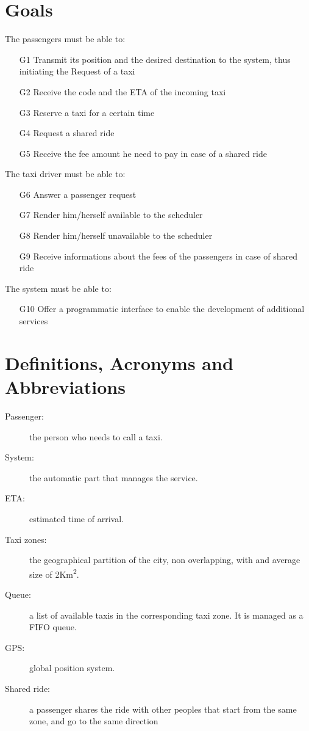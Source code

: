 \documentclass[a4paper,11pt]{report}
\begin{document}
\section{Goals}
The passengers must be able to:
\begin{itemize}
  \item [G1] Transmit its position and the desired destination to the system, thus initiating the Request of a taxi
  \item [G2] Receive the code and the ETA of the incoming taxi
  \item [G3] Reserve a taxi for a certain time
  \item [G4] Request a shared ride
  \item [G5] Receive the fee amount he need to pay in case of a shared ride
\end{itemize}
The taxi driver must be able to:
\begin{itemize}
  \item [G6] Answer a passenger request
  \item [G7] Render him/herself available to the scheduler
  \item [G8] Render him/herself unavailable to the scheduler
  \item [G9] Receive informations about the fees of the passengers in case of shared ride
\end{itemize}
The system must be able to:
\begin{itemize}
  \item [G10] Offer a programmatic interface to enable the development of additional services
\end{itemize}
\section{Definitions, Acronyms and Abbreviations}
\begin{description}
  \item[Passenger:] the person who needs to call a taxi.
  \item[System:] the automatic part that manages the service.  %
  \item[ETA:] estimated time of arrival.
  \item[Taxi zones:] the geographical partition of the city, non overlapping, with and average size of 2Km\textsuperscript{2}.
  \item[Queue:] a list of available taxis in the corresponding taxi zone. It is managed as a FIFO queue.
  \item[GPS:] global position system.
  \item[Shared ride:] a passenger shares the ride with other peoples that start from the same zone, and go to the same direction
\end{description}
 
\end{document}
